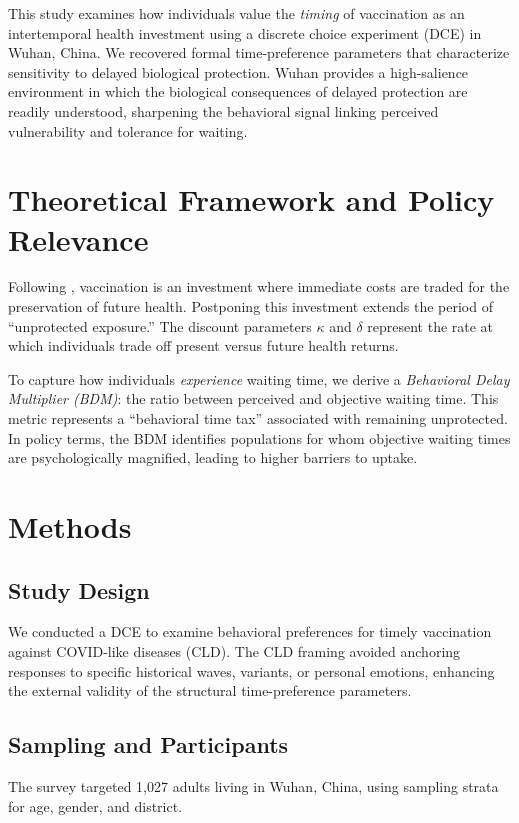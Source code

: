 \documentclass[preprint,12pt,authoryear]{elsarticle}
\begin{document}
This study examines how individuals value the \emph{timing} of vaccination as an intertemporal health investment using a discrete choice experiment (DCE) in Wuhan, China. We recovered formal time-preference parameters that characterize sensitivity to delayed biological protection. Wuhan provides a high-salience environment in which the biological consequences of delayed protection are readily understood, sharpening the behavioral signal linking perceived vulnerability and tolerance for waiting.

\section{Theoretical Framework and Policy Relevance}
Following \citet{Grossman1972}, vaccination is an investment where immediate costs are traded for the preservation of future health. Postponing this investment extends the period of ``unprotected exposure.'' The discount parameters $\kappa$ and $\delta$ represent the rate at which individuals trade off present versus future health returns. 

To capture how individuals \emph{experience} waiting time, we derive a \emph{Behavioral Delay Multiplier (BDM)}: the ratio between perceived and objective waiting time. This metric represents a ``behavioral time tax'' associated with remaining unprotected. In policy terms, the BDM identifies populations for whom objective waiting times are psychologically magnified, leading to higher barriers to uptake.

\section{Methods}
\subsection{Study Design}
We conducted a DCE to examine behavioral preferences for timely vaccination against COVID-like diseases (CLD). The CLD framing avoided anchoring responses to specific historical waves, variants, or personal emotions, enhancing the external validity of the structural time-preference parameters.

\subsection{Sampling and Participants}
The survey targeted 1,027 adults living in Wuhan, China, using sampling strata for age, gender, and district. 
\end{document}
